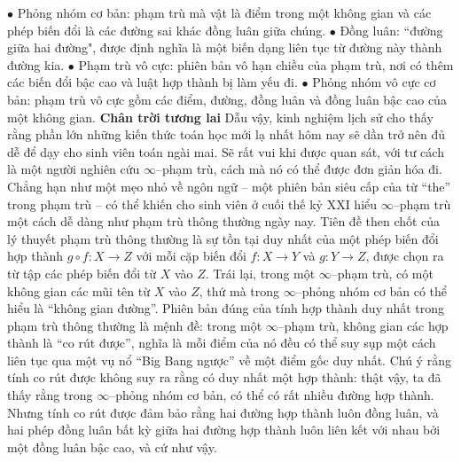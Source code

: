 \begin{multicols}{2}
	\vskip 0.1cm
	$\bullet$ Phỏng nhóm cơ bản: phạm trù mà vật là điểm trong một không gian và các phép biến đổi là các đường sai khác đồng luân giữa chúng.
	\vskip 0.1cm		
	$\bullet$ Đồng luân: ``đường giữa hai đường", được định nghĩa là một biến dạng liên tục từ đường này thành đường kia.
	\vskip 0.1cm		
	$\bullet$ Phạm trù vô cực: phiên bản vô hạn chiều của phạm trù, nơi có thêm các biến đổi bậc cao và luật hợp thành bị làm yếu đi.
	\vskip 0.1cm	
	$\bullet$ Phỏng nhóm vô cực cơ bản: phạm trù vô cực gồm các điểm, đường, đồng luân và đồng luân bậc cao của một không gian.
	\vskip 0.1cm
	\textbf{\color{duongvaotoanhoc}Chân trời tương lai}
	\vskip 0.1cm
	Dẫu vậy, kinh nghiệm lịch sử cho thấy rằng phần lớn những kiến thức toán học mới lạ nhất hôm nay sẽ dần trở nên đủ dễ để dạy cho sinh viên toán ngài mai. Sẽ rất vui khi được quan sát, với tư cách là một người nghiên cứu $\infty$--phạm trù, cách mà nó có thể được đơn giản hóa đi. Chẳng hạn như một mẹo nhỏ về ngôn ngữ -- một phiên bản siêu cấp của từ ``the'' trong phạm trù -- có thể khiến cho sinh viên ở cuối thế kỷ XXI hiểu $\infty$--phạm trù một cách dễ dàng như phạm trù thông thường ngày nay. Tiên đề then chốt của lý thuyết phạm trù thông thường là sự tồn tại duy nhất của một phép biến đổi hợp thành $g \circ f: X \to Z$ với mỗi cặp biến đổi $f: X \to Y$ và $g: Y \to Z$, được chọn ra từ tập các phép biến đổi từ $X$ vào $Z$. Trái lại, trong một $\infty$--phạm trù, có một không gian các mũi tên từ $X$ vào $Z$, thứ mà trong $\infty$--phỏng nhóm cơ bản có thể hiểu là ``không gian đường''. Phiên bản đúng của tính hợp thành duy nhất trong phạm trù thông thường là mệnh đề: trong một $\infty$--phạm trù, không gian các hợp thành là ``co rút được'', nghĩa là mỗi điểm của nó đều có thể suy sụp một cách liên tục qua một vụ nổ ``Big Bang ngược'' về một điểm gốc duy nhất.
	\vskip 0.1cm
	Chú ý rằng tính co rút được không suy ra rằng có duy nhất một hợp thành: thật vậy, ta đã thấy rằng trong $\infty$--phỏng nhóm cơ bản, có thể có rất nhiều đường hợp thành. Nhưng tính co rút được đảm bảo rằng hai đường hợp thành luôn đồng luân, và hai phép đồng luân bất kỳ giữa hai đường hợp thành luôn liên kết với nhau bởi một đồng luân bậc cao, và cứ như vậy.
	\begin{figure}[H]
		\centering
		\vspace*{-5pt}
		\captionsetup{labelformat= empty, justification=centering}

\end{figure}
\end{multicols}
